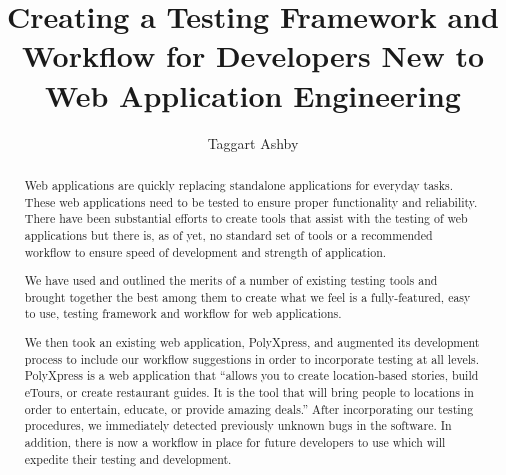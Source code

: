 \documentclass[12pt]{ucthesis}
\begin{document}

\title{Creating a Testing Framework and Workflow for Developers New to Web Application Engineering} %
\author{Taggart Ashby}
  
 
     

\maketitle

\begin{frontmatter}

\copyrightpage

\committeemembershippage

\begin{abstract}
Web applications are quickly replacing standalone applications for everyday tasks. These web applications need to be tested to ensure proper functionality and reliability. There have been substantial efforts to create tools that assist with the testing of web applications but there is, as of yet, no standard set of tools or a recommended workflow to ensure speed of development and strength of application.

We have used and outlined the merits of a number of existing testing tools and brought together the best among them to create what we feel is a fully-featured, easy to use, testing framework and workflow for web applications.

We then took an existing web application, PolyXpress, and augmented its development process to include our workflow suggestions in order to incorporate testing at all levels. PolyXpress is a web application that ``allows you to create location-based stories, build eTours, or create restaurant guides. It is the tool that will bring people to locations in order to entertain, educate, or provide amazing deals.''\cite{PX} After incorporating our testing procedures, we immediately detected previously unknown bugs in the software. In addition, there is now a workflow in place for future developers to use which will expedite their testing and development.
\end{abstract}

\tableofcontents

\end{frontmatter}
\end{document}
